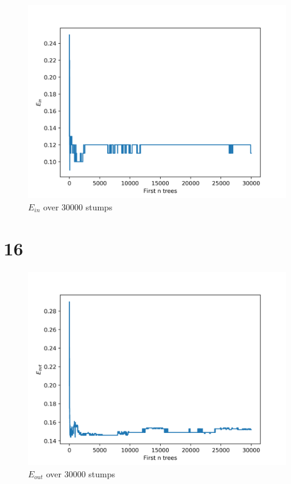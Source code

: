 \documentclass[fleqn,a4paper,12pt]{article}
\begin{document}
\begin{figure}[H]
\centering
\includegraphics[width=0.75\linewidth]{stump-ein.png}
\caption{$E_{in}$ over 30000 stumps}
\label{fig:stump-ein}
\end{figure}

\section*{16}

\begin{figure}[H]
\centering
\includegraphics[width=0.75\linewidth]{stump-eout.png}
\caption{$E_{out}$ over 30000 stumps}
\label{fig:stump-eout}
\end{figure}
\end{document}
